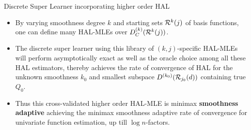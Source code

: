 \documentclass[t]{beamer}
\newlength{\wideitemsep}
\let\olditem\item
\renewcommand{\item}{\setlength{\itemsep}{\wideitemsep}\olditem}
\begin{document}
\begin{frame}{Discrete Super Learner incorporating  higher order HAL}
\begin{itemize}
    \item By varying smoothness degree $k$ and starting sets ${\cal R}^k(j)$ of basis functions, one can define many HAL-MLEs over  $D^{(k)}_C({\cal R}^k(j))$.
    \item The discrete super learner using this library of $(k,j)$-specific HAL-MLEs will perform asymptotically exact as well as the oracle choice among all these HAL estimators,  thereby achieves the rate of convergence of HAL for the unknown smoothness $k_0$  and smallest subspace $D^{(k_0)}({\cal R}_{j_0}(d))$ containing true $Q_0$.
    \item Thus this cross-validated higher order HAL-MLE is minimax {\bf smoothness adaptive} achieving the minimax smoothness adaptive rate of convergence for univariate function estimation, up till $\log n$-factors.
\end{itemize}
\end{frame}
\end{document}
